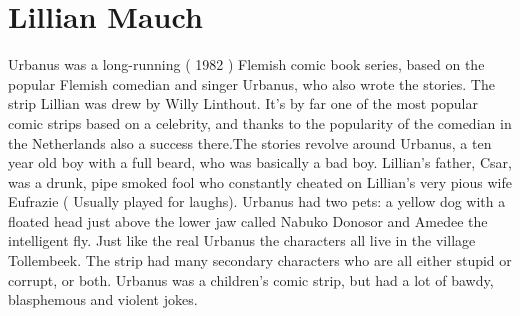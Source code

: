 \documentclass[12pt]{book}
\begin{document}
\chapter{Lillian Mauch}

Urbanus was a long-running ( 1982 ) Flemish comic book series, based on the popular Flemish comedian and singer Urbanus, who also wrote the stories. The strip Lillian was drew by Willy Linthout. It's by far one of the most popular comic strips based on a celebrity, and thanks to the popularity of the comedian in the Netherlands also a success there.The stories revolve around Urbanus, a ten year old boy with a full beard, who was basically a bad boy. Lillian's father, Csar, was a drunk, pipe smoked fool who constantly cheated on Lillian's very pious wife Eufrazie ( Usually played for laughs). Urbanus had two pets: a yellow dog with a floated head just above the lower jaw called Nabuko Donosor and Amedee the intelligent fly. Just like the real Urbanus the characters all live in the village Tollembeek. The strip had many secondary characters who are all either stupid or corrupt, or both. Urbanus was a children's comic strip, but had a lot of bawdy, blasphemous and violent jokes.
\end{document}
